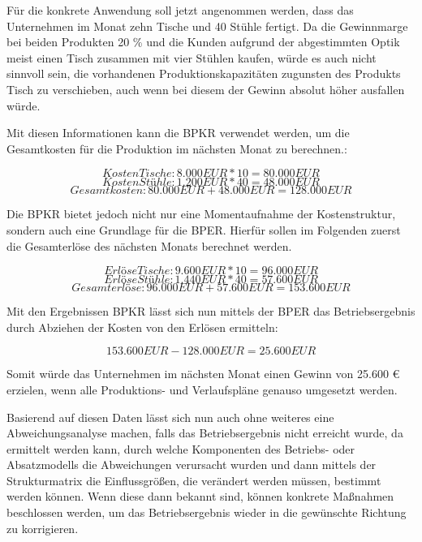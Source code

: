 Für die konkrete Anwendung soll jetzt angenommen werden, dass das Unternehmen im Monat zehn Tische und 40 Stühle fertigt. Da die Gewinnmarge bei beiden Produkten 20 \% und die Kunden aufgrund der abgestimmten Optik meist einen Tisch zusammen mit vier Stühlen kaufen, würde es auch nicht sinnvoll sein, die vorhandenen Produktionskapazitäten zugunsten des Produkts Tisch zu verschieben, auch wenn bei diesem der Gewinn absolut höher ausfallen würde.

Mit diesen Informationen kann die BPKR verwendet werden, um die Gesamtkosten für die Produktion im nächsten Monat zu berechnen.:

\[ Kosten Tische: 8.000 EUR * 10 = 80.000 EUR \]
\[ Kosten Stühle: 1.200 EUR * 40 = 48.000 EUR \]
\[ Gesamtkosten: 80.000 EUR + 48.000 EUR = 128.000 EUR \]

Die BPKR bietet jedoch nicht nur eine Momentaufnahme der Kostenstruktur, sondern auch eine Grundlage für die BPER. Hierfür sollen im Folgenden zuerst die Gesamterlöse des nächsten Monats berechnet werden.

\[ Erlöse Tische: 9.600 EUR * 10 = 96.000 EUR \]
\[ Erlöse Stühle: 1.440 EUR * 40 = 57.600 EUR \]
\[ Gesamterlöse: 96.000 EUR + 57.600 EUR = 153.600 EUR \]

Mit den Ergebnissen BPKR lässt sich nun mittels der BPER das Betriebsergebnis durch Abziehen der Kosten von den Erlösen ermitteln:

\[ 153.600 EUR - 128.000 EUR = 25.600 EUR \]

Somit würde das Unternehmen im nächsten Monat einen Gewinn von 25.600 {\euro} erzielen, wenn alle Produktions- und Verlaufspläne genauso umgesetzt werden.

Basierend auf diesen Daten lässt sich nun auch ohne weiteres eine Abweichungsanalyse machen, falls das Betriebsergebnis nicht erreicht wurde, da ermittelt werden kann, durch welche Komponenten des Betriebs- oder Absatzmodells die Abweichungen verursacht wurden und dann mittels der Strukturmatrix die Einflussgrö{\ss}en, die verändert werden müssen, bestimmt werden können. Wenn diese dann bekannt sind, können konkrete Ma{\ss}nahmen beschlossen werden, um das Betriebsergebnis wieder in die gewünschte Richtung zu korrigieren.